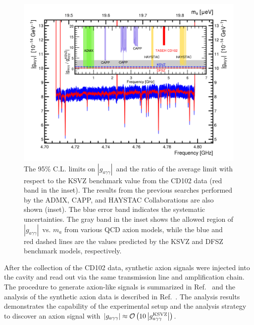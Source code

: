 \documentclass[%
 reprint,prl, %
superscriptaddress,
nobibnotes,
 amsmath,amssymb,
 aps,
]{revtex4-2}
\newcommand{\gagg}{\ensuremath{\left|g_{a\gamma\gamma}\right|}}
\newcommand{\bgagg}{\ensuremath{g_{a\gamma\gamma}}}
\begin{document}
\begin{figure} 
  \centering
  \includegraphics[width=12.9cm]{figures/combineTASEH_all.png}
  \caption{%
The 95\% C.L. limits on \gagg\ and the ratio of the 
average limit with respect to the KSVZ benchmark value 
 from the CD102 data (red band in the inset). The results 
 from the previous searches performed by the 
 ADMX, CAPP, and HAYSTAC Collaborations are also shown (inset). 
 The blue error band indicates the systematic 
  uncertainties. The gray band in the inset shows the allowed region of 
 \gagg\ vs. $m_a$ 
 from various QCD axion models, while the blue and red dashed lines are the 
values predicted by the KSVZ and DFSZ benchmark models, respectively.
 }

  \label{fig:gaggall}
\end{figure}




After the collection of the CD102 data, 
synthetic axion signals were injected into the cavity and read out via the 
same transmission line and amplification chain. 
The procedure to generate axion-like signals is summarized in 
Ref.~\cite{TASEHInstrumentation} and the analysis of the synthetic axion 
data is described in Ref.~\cite{TASEHAnalysis}. 
The analysis results demonstrates
the capability of the experimental setup and the analysis strategy to discover
an axion signal with 
$\gagg\approx {\cal O}\left(10\left|\bgagg^\text{KSVZ}\right|\right)$.
\end{document}
